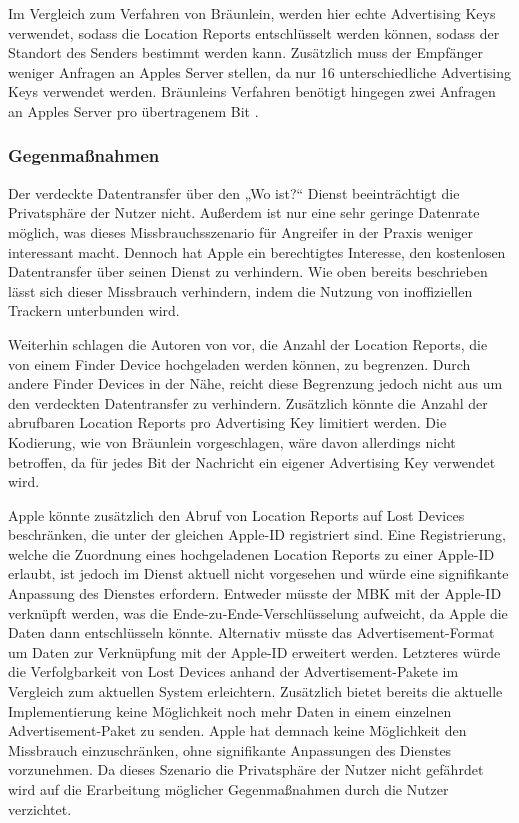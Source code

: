 Im Vergleich zum Verfahren von Bräunlein, werden hier echte Advertising Keys verwendet, sodass die Location Reports entschlüsselt werden können, sodass der Standort des Senders bestimmt werden kann.
Zusätzlich muss der Empfänger weniger Anfragen an Apples Server stellen, da nur 16 unterschiedliche Advertising Keys verwendet werden.
Bräunleins Verfahren benötigt hingegen zwei Anfragen an Apples Server pro übertragenem Bit \cite{braeunlein_sendmy}.


\subsubsection{Gegenmaßnahmen}
Der verdeckte Datentransfer über den „Wo ist?“ Dienst beeinträchtigt die Privatsphäre der Nutzer nicht.
Außerdem ist nur eine sehr geringe Datenrate möglich, was dieses Missbrauchsszenario für Angreifer in der Praxis weniger interessant macht.
Dennoch hat Apple ein berechtigtes Interesse, den kostenlosen Datentransfer über seinen Dienst zu verhindern.
Wie oben bereits beschrieben lässt sich dieser Missbrauch verhindern, indem die Nutzung von inoffiziellen Trackern unterbunden wird.

Weiterhin schlagen die Autoren von \cite{Tonetto_FindMy} vor, die Anzahl der Location Reports, die von einem Finder Device hochgeladen werden können, zu begrenzen.
Durch andere Finder Devices in der Nähe, reicht diese Begrenzung jedoch nicht aus um den verdeckten Datentransfer zu verhindern.
Zusätzlich könnte die Anzahl der abrufbaren Location Reports pro Advertising Key limitiert werden.
Die Kodierung, wie von Bräunlein \cite{braeunlein_sendmy} vorgeschlagen, wäre davon allerdings nicht betroffen, da für jedes Bit der Nachricht ein eigener Advertising Key verwendet wird.

Apple könnte zusätzlich den Abruf von Location Reports auf Lost Devices beschränken, die unter der gleichen Apple-ID registriert sind.
Eine Registrierung, welche die Zuordnung eines hochgeladenen Location Reports zu einer Apple-ID erlaubt, ist jedoch im Dienst aktuell nicht vorgesehen und würde eine signifikante Anpassung des Dienstes erfordern.
Entweder müsste der \ac{MBK} mit der Apple-ID verknüpft werden, was die Ende-zu-Ende-Verschlüsselung aufweicht, da Apple die Daten dann entschlüsseln könnte.
Alternativ müsste das Advertisement-Format um Daten zur Verknüpfung mit der Apple-ID erweitert werden.
Letzteres würde die Verfolgbarkeit von Lost Devices anhand der Advertisement-Pakete im Vergleich zum aktuellen System erleichtern.
Zusätzlich bietet bereits die aktuelle Implementierung keine Möglichkeit noch mehr Daten in einem einzelnen Advertisement-Paket zu senden.
Apple hat demnach keine Möglichkeit den Missbrauch einzuschränken, ohne signifikante Anpassungen des Dienstes vorzunehmen.
Da dieses Szenario die Privatsphäre der Nutzer nicht gefährdet wird auf die Erarbeitung möglicher Gegenmaßnahmen durch die Nutzer verzichtet.


